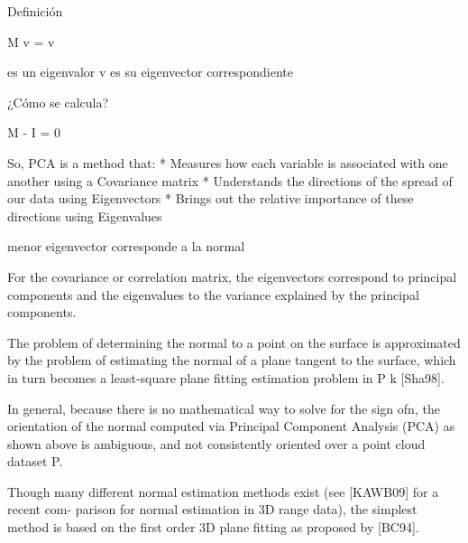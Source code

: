 Definición

M v = \lambda v

\lambda es un eigenvalor
v es su eigenvector correspondiente 

¿Cómo se calcula?

M - \lambda I = 0


So, PCA is a method that:
	* Measures how each variable is associated with one another using a Covariance matrix
	* Understands the directions of the spread of our data using Eigenvectors
	* Brings out the relative importance of these directions using Eigenvalues

menor eigenvector corresponde a la normal


For the covariance or correlation matrix, the eigenvectors correspond to
principal components and the eigenvalues to the variance explained by the
principal components.

The problem of determining the normal to a point on
the surface is approximated by the problem of estimating the normal of a plane tangent to the
surface, which in turn becomes a least-square plane fitting estimation problem in P
k [Sha98].

In general, because there is no mathematical way to solve for the sign of⃗n, the orientation of
the normal computed via Principal Component Analysis (PCA) as shown above is ambiguous,
and not consistently oriented over a point cloud dataset P.


Though many different normal estimation methods exist (see [KAWB09] for a recent com-
parison for normal estimation in 3D range data), the simplest method is based on the first order
3D plane fitting as proposed by [BC94].
